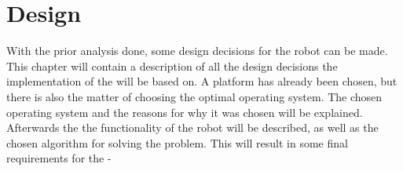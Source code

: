 \chapter{Design} \label{cha:design}

With the prior analysis done, some design decisions for the robot can be made. This chapter will contain a description of all the design decisions the implementation of the \projname{} will be based on. A platform has already been chosen, but there is also the matter of choosing the optimal operating system. The chosen operating system and the reasons for why it was chosen will be explained. Afterwards the the functionality of the robot will be described, as well as the chosen algorithm for solving the problem. This will result in some final requirements for the \projname{}-









